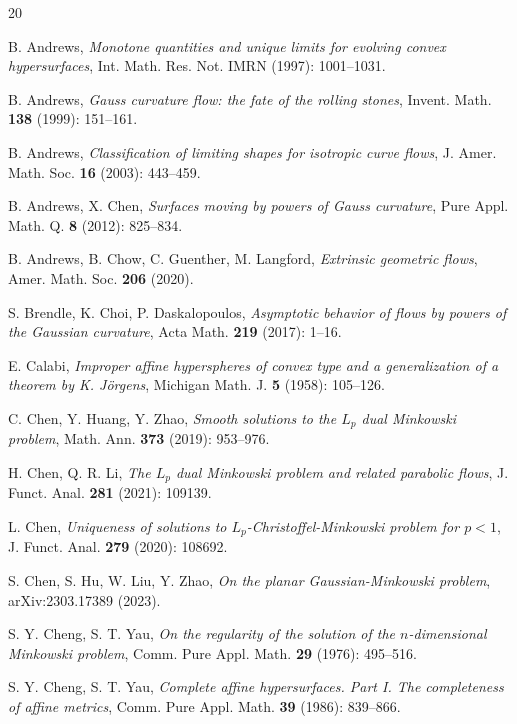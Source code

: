 \documentclass[12pt]{amsart}
\theoremstyle{definition}
\numberwithin{equation}{section}
\theoremstyle{remark}
\numberwithin{equation}{section}
\begin{document}
\begin{thebibliography}{20}

 B. Andrews, \textit{Monotone quantities and unique limits for evolving convex hypersurfaces}, Int. Math. Res. Not. IMRN (1997): 1001--1031.

 B. Andrews, \textit{Gauss curvature flow: the fate of the rolling stones}, Invent. Math. \textbf{138} (1999): 151--161.

 B. Andrews, \textit{Classification of limiting shapes for isotropic curve flows}, J. Amer. Math. Soc. \textbf{16} (2003): 443--459. 

 B. Andrews, X. Chen, \textit{Surfaces moving by powers of Gauss curvature}, Pure Appl. Math. Q. \textbf{8} (2012): 825--834. 

 B. Andrews, B. Chow, C. Guenther, M. Langford, \textit{Extrinsic geometric flows},  Amer. Math. Soc. \textbf{206} (2020).

 S. Brendle, K. Choi, P. Daskalopoulos, \textit{Asymptotic behavior of flows by powers of the Gaussian curvature}, Acta Math. \textbf{219} (2017): 1--16.

 E. Calabi, \textit{Improper affine hyperspheres of convex type and a generalization of a theorem by K. J\"{o}rgens}, Michigan Math. J. \textbf{5} (1958): 105--126.

 C. Chen, Y. Huang, Y. Zhao, \textit{Smooth solutions to the $L_p$ dual Minkowski problem}, Math. Ann. \textbf{373} (2019): 953--976.

 H. Chen, Q. R. Li, \textit{The $L_p$ dual Minkowski problem and related parabolic flows}, J. Funct. Anal. \textbf{281} (2021): 109139.

 L. Chen, \textit{Uniqueness of solutions to $L_p$-Christoffel-Minkowski problem for $p<1$}, J. Funct. Anal. \textbf{279} (2020): 108692.

 S. Chen, S. Hu, W. Liu, Y. Zhao, \textit{On the planar Gaussian-Minkowski problem}, arXiv:2303.17389 (2023).

 S. Y. Cheng, S. T. Yau, \textit{On the regularity of the solution of the $n$-dimensional Minkowski problem}, Comm. Pure Appl. Math. \textbf{29} (1976): 495--516.

 S. Y. Cheng, S. T. Yau, \textit{Complete affine hypersurfaces. Part I. The completeness of affine metrics}, Comm. Pure Appl. Math. \textbf{39} (1986): 839--866.


\end{thebibliography}
\end{document}

